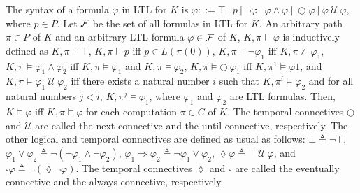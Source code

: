 \documentclass[10pt, conference, compsocconf]{IEEEtran}
\begin{document}
The syntax of a formula $\varphi$ in LTL for $K$ is $\varphi ::= \top \:|\: p \:|\: \neg \varphi \:|\: \varphi \land \varphi \:|\: \bigcirc \varphi \:|\: \varphi \: \mathcal{U} \: \varphi$, where $p \in P$. 
Let $\cal F$ be the set of all formulas in LTL for $K$. 
An arbitrary path $\pi \in P$ of $K$ and an arbitrary LTL formula $\varphi \in \cal F$ of $K$,
$K, \pi \models \varphi$ is inductively defined as $K, \pi \models \top$, $K, \pi \models p$ iff
$p \in L(\pi(0))$, $K, \pi \models \neg \varphi_1$ iff $K, \pi \not\models \varphi_1$, 
$K, \pi \models \varphi_1 \land \varphi_2$ iff
$K, \pi \models \varphi_1$ and $K, \pi \models \varphi_2$, 
$K, \pi \models \bigcirc \ \varphi_1$ iff $K, \pi^1\models \varphi1$,
and $K, \pi \models \varphi_1 \: \mathcal{U} \: \varphi_2$ iff there exists a natural number $i$
such that $K, \pi^i\models \varphi_2$ and for all natural numbers $j < i$,
$K, \pi^j \models \varphi_1$, where $\varphi_1$ and $\varphi_2$ are LTL formulas. 
Then,
$K \models \varphi$ iff $K, \pi \models \varphi$ for each computation $\pi \in C$ of $K$. 
The temporal connectives $\bigcirc$ and $\mathcal{U}$ are called the next connective
and the until connective, respectively. The other logical
and temporal connectives are defined as usual as follows:
$\bot \triangleq \neg\top$, 
$\varphi_1 \lor \varphi_2 \triangleq \neg(\neg\varphi_1 \land \neg\varphi_2)$, 
$\varphi_1 \Rightarrow \varphi_2 \triangleq \neg\varphi_1 \lor \varphi_2$,
$\lozenge \varphi \triangleq \top \ \mathcal{U}\ \varphi$, 
and $\square \varphi \triangleq \neg(\lozenge \neg\varphi)$. 
The temporal connectives $\lozenge$ and $\square$ are called the eventually connective and the always connective, respectively.


\end{document}
